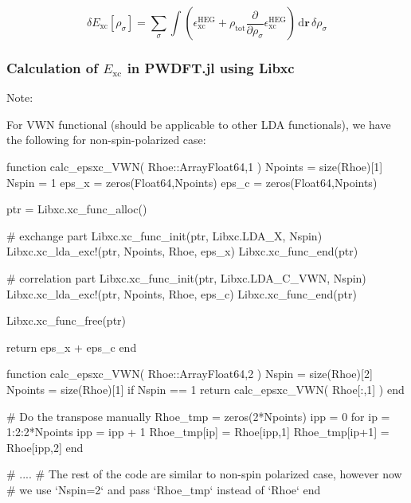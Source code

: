 \begin{equation}
\delta E_{\mathrm{xc}}\left[\rho_{\sigma}\right] =
\sum_{\sigma} \int
\left(
\epsilon^{\mathrm{HEG}}_{\mathrm{xc}} +
\rho_{\mathrm{tot}} \frac{\partial}{\partial \rho_{\sigma}} \epsilon^{\mathrm{HEG}}_{\mathrm{xc}}
\right)
\, \mathrm{d}\mathbf{r}\,\delta \rho_{\sigma}
\end{equation}


\subsubsection{Calculation of $E_{\mathrm{xc}}$ in \textsf{PWDFT.jl} using Libxc}

Note:

For VWN functional (should be applicable to other LDA functionals), we have the following
for non-spin-polarized case:
%
\begin{juliacode}
function calc_epsxc_VWN( Rhoe::Array{Float64,1} )
    Npoints = size(Rhoe)[1]
    Nspin = 1
    eps_x = zeros(Float64,Npoints)
    eps_c = zeros(Float64,Npoints)

    ptr = Libxc.xc_func_alloc()

    # exchange part
    Libxc.xc_func_init(ptr, Libxc.LDA_X, Nspin)
    Libxc.xc_lda_exc!(ptr, Npoints, Rhoe, eps_x)
    Libxc.xc_func_end(ptr)

    # correlation part
    Libxc.xc_func_init(ptr, Libxc.LDA_C_VWN, Nspin)
    Libxc.xc_lda_exc!(ptr, Npoints, Rhoe, eps_c)
    Libxc.xc_func_end(ptr)

    Libxc.xc_func_free(ptr)

    return eps_x + eps_c
end
\end{juliacode}


\begin{juliacode}
function calc_epsxc_VWN( Rhoe::Array{Float64,2} )
    Nspin = size(Rhoe)[2]
    Npoints = size(Rhoe)[1]
    if Nspin == 1
        return calc_epsxc_VWN( Rhoe[:,1] )
    end

    # Do the transpose manually
    Rhoe_tmp = zeros(2*Npoints)
    ipp = 0
    for ip = 1:2:2*Npoints
        ipp = ipp + 1
        Rhoe_tmp[ip] = Rhoe[ipp,1]
        Rhoe_tmp[ip+1] = Rhoe[ipp,2]
    end

    # ....
    # The rest of the code are similar to non-spin polarized case, however now
    # we use `Nspin=2` and pass `Rhoe_tmp` instead of `Rhoe`
end
\end{juliacode}

